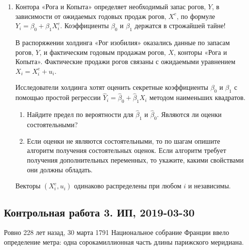 \begin{enumerate}
\item Контора «Рога и Копыта» определяет
	необходимый запас рогов, $Y$, в зависимости от ожидаемых годовых продаж рогов,
	$X^e$, по формуле $Y_i = \beta_0 + \beta_1 X^e_i$. Коэффициенты $\beta_0$ и $\beta_1$ держатся в строжайшей тайне!

	В распоряжении холдинга «Рог изобилия» оказались данные
	по запасам рогов, $Y$, и фактическим годовым продажам рогов, $X$, конторы «Рога и Копыта». Фактические продажи рогов связаны с ожидаемыми уравнением $X_i = X_i^e + u_i$.

Исследователи холдинга хотят оценить секретные коэффициенты $\beta_0$ и $\beta_1$ с помощью простой регрессии $\hat Y_i = \hat \beta_0 + \hat \beta_1 X_i$ методом наименьших квадратов.

\begin{enumerate}

	\item Найдите предел по вероятности для $\hat \beta_1$ и $\hat\beta_0$. Являются ли оценки состоятельными?
	\item Если оценки не являются состоятельными, то по шагам опишите алгоритм получения состоятельных оценок. Если алгоритм требует получения дополнительных переменных, то укажите, какими свойствами они должны обладать.

\end{enumerate}


Векторы $(X_i^e, u_i)$ одинаково распределены при любом $i$ и независимы.



\end{enumerate}


\subsection{Контрольная работа 3. ИП, 2019-03-30}




Ровно 228 лет назад, 30 марта 1791 Национальное собрание Франции ввело определение метра: одна сорокамиллионная часть длины парижского меридиана.


